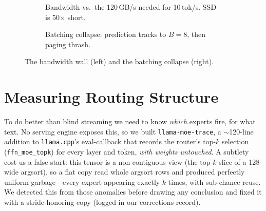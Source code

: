 \documentclass[11pt]{article}
\newcommand{\tps}{tok/s}
\begin{document}
\begin{figure}[t]
\begin{subfigure}{0.48\textwidth}\centering
{}
\caption{Bandwidth vs.\ the 120\,GB/s needed for 10\,\tps. SSD is 50$\times$ short.}
\end{subfigure}\hfill
\begin{subfigure}{0.48\textwidth}\centering
{}
\caption{Batching collapse: prediction tracks to $B{=}8$, then paging thrash.}
\end{subfigure}
\caption{The bandwidth wall (left) and the batching collapse (right).}
\label{fig:batch}
\end{figure}

\section{Measuring Routing Structure}
\label{sec:trace}
To do better than blind streaming we need to know \emph{which} experts fire, for
what text. No serving engine exposes this, so we built \texttt{llama-moe-trace},
a $\sim$120-line addition to \texttt{llama.cpp}'s eval-callback that records the
router's top-$k$ selection (\texttt{ffn\_moe\_topk}) for every layer and token,
\emph{with weights untouched}. A subtlety cost us a false start: this tensor is a
non-contiguous view (the top-$k$ slice of a 128-wide argsort), so a flat copy
read whole argsort rows and produced perfectly uniform garbage---every expert
appearing exactly $k$ times, with sub-chance reuse. We detected this from those
anomalies before drawing any conclusion and fixed it with a stride-honoring copy
(logged in our corrections record).
\end{document}
